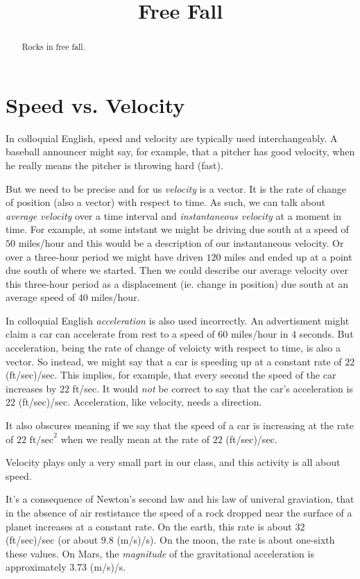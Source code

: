 \documentclass{ximera}
\title{Free Fall}
\begin{document}
\begin{abstract}
Rocks in free fall.
\end{abstract}
\maketitle


\section{Speed vs. Velocity}

In colloquial English, speed and velocity are typically used interchangeably. A baseball announcer might say, for example, that a pitcher has good velocity, when he really means the pitcher is throwing hard (fast).

But we need to be precise and for us \emph{velocity} is a vector. It is the rate of change of position (also a vector) with respect to time. As such, we can talk about \emph{average velocity} over a time interval and \emph{instantaneous velocity} at a moment in time. For example, at some intstant we might be driving due south at a speed of $50$ miles/hour and this would be a description of our instantaneous velocity. Or over a three-hour period we might have driven $120$ miles and ended up at a point due south of where we started. Then we could describe our average velocity over this three-hour period as a displacement (ie. change in position) due south at an average speed of $40$ miles/hour.

In colloquial English \emph{acceleration} is also used incorrectly. An advertisment might claim a car can accelerate from rest to a speed of $60$ miles/hour in $4$ seconds. But acceleration, being the rate of change of veloicty with respect to time, is also a vector. So instead, we might say that a car is speeding up at a constant rate of $22$ (ft/sec)/sec. This implies, for example, that every second the speed of the car increases by $22$ ft/sec. It would \emph{not} be correct to say that the car's acceleration is $22$ (ft/sec)/sec. Acceleration, like velocity, needs a direction.

It also obscures meaning if we say that the speed of a car is increasing at the rate of $22\text{ ft/sec}^2$ when we really mean at the rate of $22$ (ft/sec)/sec.

Velocity plays only a very small part in our class, and this activity is all about speed.

It's a consequence of Newton's second law and his law of univeral graviation, that in the absence of air restistance the speed of a rock dropped near the surface of a planet increases at a constant rate. On the earth, this rate is about $32$ (ft/sec)/sec (or about $9.8$ (m/s)/s). On the moon, the rate is about one-sixth these values. On Mars, the \emph{magnitude} of the gravitational acceleration is approximately $3.73$ (m/s)/s.
\end{document}
